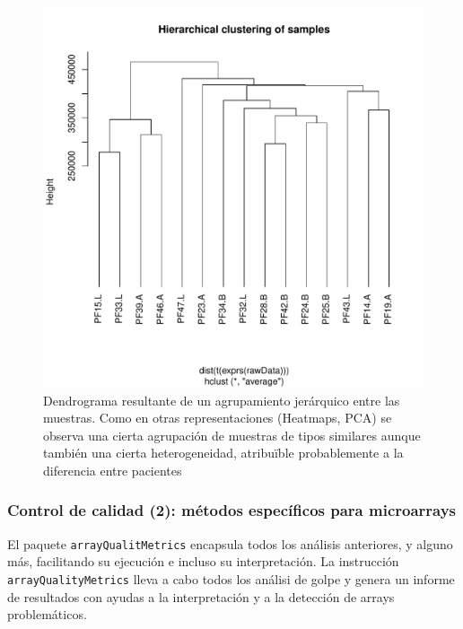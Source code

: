 \documentclass[a4paper]{article}\usepackage[]{graphicx}\usepackage[]{color}
\makeatletter
\def\maxwidth{ %
  \ifdim\Gin@nat@width>\linewidth
    \linewidth
  \else
    \Gin@nat@width
  \fi
}
\newenvironment{knitrout}{}{} %
\newcommand{\Rpackage}[1]{{\texttt{#1}}}
\makeatother
\begin{document}
\begin{figure}
\centering
\begin{knitrout}
\color{fgcolor}
\includegraphics[width=\maxwidth]{images/graficplotDendro-1} 

\end{knitrout}
\caption{Dendrograma resultante de un agrupamiento jerárquico entre las muestras.
  Como en otras representaciones (Heatmaps, PCA) se observa una cierta agrupación de muestras de tipos similares aunque también una cierta heterogeneidad, atribuïble probablemente a la diferencia entre pacientes}
\label{fig:dendrograma}
\end{figure}

\subsubsection{Control de calidad (2): métodos específicos para microarrays}

El paquete \Rpackage{arrayQualitMetrics} encapsula todos los análisis anteriores, y alguno más, facilitando su ejecución e incluso su interpretación. La instrucción \texttt{arrayQualityMetrics} lleva a cabo todos los análisi de golpe y genera un informe de resultados con ayudas a la interpretación y a la detección de arrays problemáticos.
\end{document}
